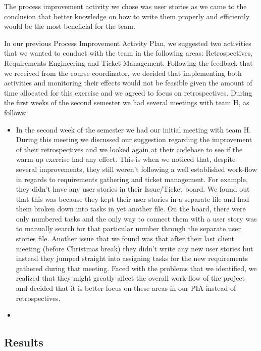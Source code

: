 \documentclass[11pt]{article}
\begin{document}
\par
The process improvement activity we chose was user stories as we came to the conclusion that better knowledge on how to write them properly and efficiently would be the most beneficial for the team.

\par
    In our previous Process Improvement Activity Plan, we suggested two activities that we wanted to conduct with the team in the following areas: Retrospectives, Requirements Engineering and Ticket Management. Following the feedback that we received from the course coordinator, we decided that implementing both activities and monitoring their effects would not be feasible given the amount of time allocated for this exercise and we agreed to focus on retrospectives. During the first weeks of the second semester we had several meetings with team H, as follows:

\begin{itemize}
\item In the second week of the semester we had our initial meeting with team H. During this meeting we discussed our suggestion regarding the improvement of their retrospectives and we looked again at their codebase to see if the warm-up exercise had any effect. This is when we noticed that, despite several improvements, they still weren't following a well established work-flow in regards to requirements gathering and ticket management. For example, they didn't have any user stories in their Issue/Ticket board. We found out that this was because they kept their user stories in a separate file and had them broken down into tasks in yet another file. On the board, there were only numbered tasks and the only way to connect them with a user story was to manually search for that particular number through the separate user stories file. Another issue that we found was that after their last client meeting (before Christmas break) they didn't write any new user stories but instead they jumped straight into assigning tasks for the new requirements gathered during that meeting. Faced with the problems that we identified, we realized that they might greatly affect the overall work-flow of the project and decided that it is better focus on these areas in our PIA instead of retrospectives.

\item 
\end{itemize}

\subsection*{Results}
\end{document}
